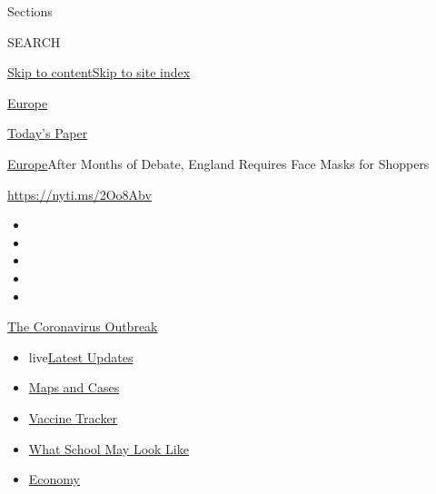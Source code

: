 Sections

SEARCH

\protect\hyperlink{site-content}{Skip to
content}\protect\hyperlink{site-index}{Skip to site index}

\href{https://www.nytimes.com/section/world/europe}{Europe}

\href{https://myaccount.nytimes.com/auth/login?response_type=cookie\&client_id=vi}{}

\href{https://www.nytimes.com/section/todayspaper}{Today's Paper}

\href{/section/world/europe}{Europe}\textbar{}After Months of Debate,
England Requires Face Masks for Shoppers

\url{https://nyti.ms/2Oo8Abv}

\begin{itemize}
\item
\item
\item
\item
\item
\end{itemize}

\href{https://www.nytimes.com/news-event/coronavirus?action=click\&pgtype=Article\&state=default\&region=TOP_BANNER\&context=storylines_menu}{The
Coronavirus Outbreak}

\begin{itemize}
\tightlist
\item
  live\href{https://www.nytimes.com/2020/08/01/world/coronavirus-covid-19.html?action=click\&pgtype=Article\&state=default\&region=TOP_BANNER\&context=storylines_menu}{Latest
  Updates}
\item
  \href{https://www.nytimes.com/interactive/2020/us/coronavirus-us-cases.html?action=click\&pgtype=Article\&state=default\&region=TOP_BANNER\&context=storylines_menu}{Maps
  and Cases}
\item
  \href{https://www.nytimes.com/interactive/2020/science/coronavirus-vaccine-tracker.html?action=click\&pgtype=Article\&state=default\&region=TOP_BANNER\&context=storylines_menu}{Vaccine
  Tracker}
\item
  \href{https://www.nytimes.com/interactive/2020/07/29/us/schools-reopening-coronavirus.html?action=click\&pgtype=Article\&state=default\&region=TOP_BANNER\&context=storylines_menu}{What
  School May Look Like}
\item
  \href{https://www.nytimes.com/live/2020/07/31/business/stock-market-today-coronavirus?action=click\&pgtype=Article\&state=default\&region=TOP_BANNER\&context=storylines_menu}{Economy}
\end{itemize}

